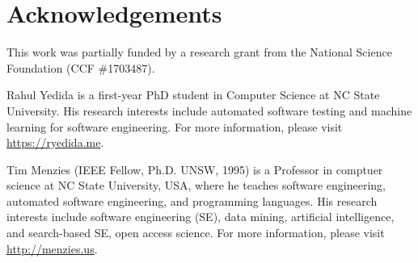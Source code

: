 \documentclass[10pt,compsoc,twocolumn]{IEEEtran}
\begin{document}
 
\section*{Acknowledgements}
This work was partially funded by 
a research grant from the National Science Foundation (CCF \#1703487).

\balance

 

\begin{minipage}{.5\textwidth}
\begin{IEEEbiography}{Rahul Yedida} is a first-year PhD student in Computer Science at NC State University. His research interests include automated software testing and machine learning for software engineering. For more information, please visit \url{https://ryedida.me}.
\end{IEEEbiography}
 

\begin{IEEEbiography}{Tim Menzies} (IEEE Fellow, Ph.D. UNSW, 1995)
is a Professor in comptuer science  at NC State University, USA,  
where he teaches software engineering,
automated software engineering,
and programming languages.
His research interests include software engineering (SE), data mining, artificial intelligence, and search-based SE, open access science. 
For more information,  please visit \url{http://menzies.us}.
\end{IEEEbiography}
\end{minipage}
\end{document}
